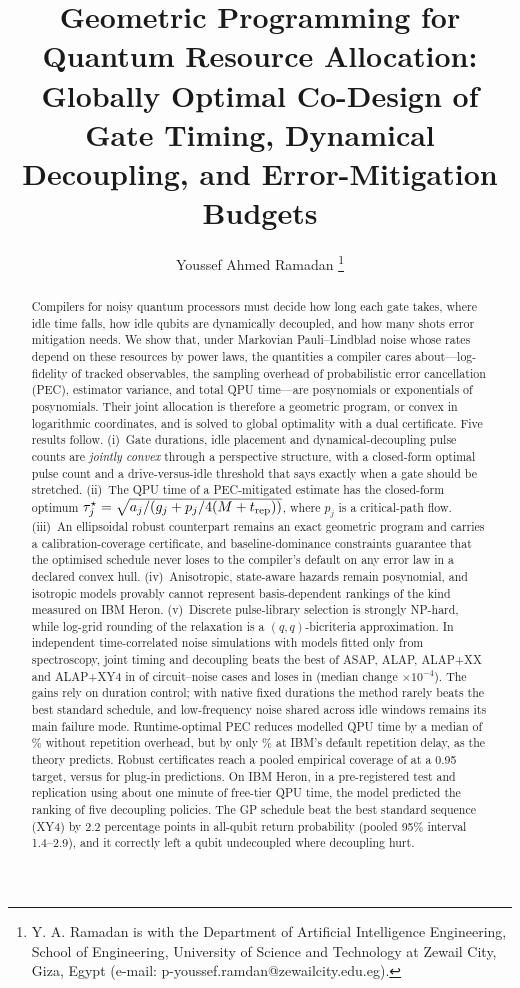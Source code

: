 \documentclass[10pt,journal]{IEEEtran}
\title{Geometric Programming for Quantum Resource Allocation:\\
Globally Optimal Co-Design of Gate Timing, Dynamical Decoupling, and Error-Mitigation Budgets}
\author{Youssef Ahmed Ramadan%
\thanks{Y. A. Ramadan is with the Department of Artificial Intelligence Engineering, School of Engineering,
University of Science and Technology at Zewail City, Giza, Egypt (e-mail: p-youssef.ramdan@zewailcity.edu.eg).}}
\theoremstyle{remark}
\begin{document}
\maketitle

\begin{abstract}
Compilers for noisy quantum processors must decide how long each gate takes, where idle time falls, how
idle qubits are dynamically decoupled, and how many shots error mitigation needs. We show that, under
Markovian Pauli--Lindblad noise whose rates depend on these resources by power laws, the quantities a
compiler cares about---log-fidelity of tracked observables, the sampling overhead of probabilistic error
cancellation (PEC), estimator variance, and total QPU time---are posynomials or exponentials of posynomials.
Their joint allocation is therefore a geometric program, or convex in logarithmic coordinates, and is solved
to global optimality with a dual certificate. Five results follow. (i)~Gate durations, idle placement and
dynamical-decoupling pulse counts are \emph{jointly convex} through a perspective structure, with a closed-form
optimal pulse count and a drive-versus-idle threshold that says exactly when a gate should be stretched.
(ii)~The QPU time of a PEC-mitigated estimate has the closed-form optimum
$\tau_j^\star=\sqrt{a_j/(g_j+p_j/4(M+t_{\rm rep}))}$, where $p_j$ is a critical-path flow. (iii)~An
ellipsoidal robust counterpart remains an exact geometric program and carries a calibration-coverage
certificate, and baseline-dominance constraints guarantee that the optimised schedule never loses to the
compiler's default on any error law in a declared convex hull. (iv)~Anisotropic, state-aware hazards remain
posynomial, and isotropic models provably cannot represent basis-dependent rankings of the kind measured on
IBM Heron. (v)~Discrete pulse-library selection is strongly NP-hard, while log-grid rounding of the relaxation
is a $(q,q)$-bicriteria approximation. In independent time-correlated noise simulations with models fitted only
from spectroscopy, joint timing and decoupling beats the best of ASAP, ALAP, ALAP+XX and ALAP+XY4 in
\CTwoWins{} of \CTwoCases{} circuit--noise cases and loses in \CTwoLosses{} (median change \CTwoMedian$\times10^{-4}$).
The gains rely on duration control; with native fixed durations the method rarely beats the best standard
schedule, and low-frequency noise shared across idle windows remains its main failure mode. Runtime-optimal PEC reduces modelled
QPU time by a median of \CThreeZero\% without repetition overhead, but by only \CThreeIBM\% at IBM's default
repetition delay, as the theory predicts. Robust certificates reach a pooled empirical coverage of
\CFourRobust{} at a 0.95 target, versus \CFourPlugin{} for plug-in predictions. On IBM Heron, in a pre-registered test and replication using about one minute of free-tier
QPU time, the model predicted the ranking of five decoupling policies. The GP schedule beat the best standard
sequence (XY4) by 2.2 percentage points in all-qubit return probability (pooled 95\% interval 1.4--2.9), and it
correctly left a qubit undecoupled where decoupling hurt.
\end{abstract}
\end{document}
